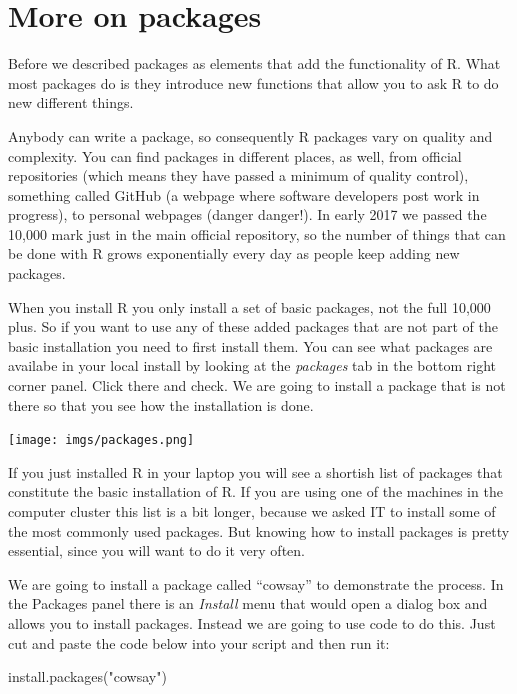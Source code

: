 \documentclass[
]{book}
\newenvironment{Shaded}{\begin{snugshade}}{\end{snugshade}}
\newcommand{\FunctionTok}[1]{\textcolor[rgb]{0.00,0.00,0.00}{#1}}
\newcommand{\NormalTok}[1]{#1}
\newcommand{\StringTok}[1]{\textcolor[rgb]{0.31,0.60,0.02}{#1}}
\begin{document}
\hypertarget{more-on-packages}{%
\section{More on packages}\label{more-on-packages}}

Before we described packages as elements that add the functionality of R. What most packages do is they introduce new functions that allow you to ask R to do new different things.

Anybody can write a package, so consequently R packages vary on quality and complexity. You can find packages in different places, as well, from official repositories (which means they have passed a minimum of quality control), something called GitHub (a webpage where software developers post work in progress), to personal webpages (danger danger!). In early 2017 we passed the 10,000 mark just in the main official repository, so the number of things that can be done with R grows exponentially every day as people keep adding new packages.

When you install R you only install a set of basic packages, not the full 10,000 plus. So if you want to use any of these added packages that are not part of the basic installation you need to first install them. You can see what packages are availabe in your local install by looking at the \emph{packages} tab in the bottom right corner panel. Click there and check. We are going to install a package that is not there so that you see how the installation is done.

\texttt{[image: imgs/packages.png]}

If you just installed R in your laptop you will see a shortish list of packages that constitute the basic installation of R. If you are using one of the machines in the computer cluster this list is a bit longer, because we asked IT to install some of the most commonly used packages. But knowing how to install packages is pretty essential, since you will want to do it very often.

We are going to install a package called ``cowsay'' to demonstrate the process. In the Packages panel there is an \emph{Install} menu that would open a dialog box and allows you to install packages. Instead we are going to use code to do this. Just cut and paste the code below into your script and then run it:

\begin{Shaded}
\begin{Highlighting}[]
\FunctionTok{install.packages}\NormalTok{(}\StringTok{"cowsay"}\NormalTok{)}
\end{Highlighting}
\end{Shaded}
\end{document}
